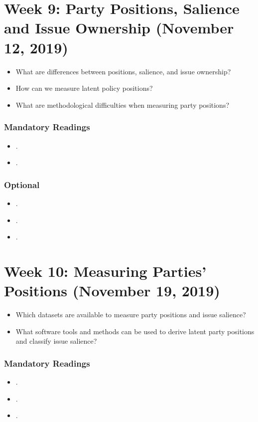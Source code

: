 \documentclass[abstract=on,parskip=full,headings=standardclasses,fontsize=11pt,paper=a4]{scrartcl}
\begin{document}
\section{Week 9:  Party Positions, Salience and Issue Ownership (November 12, 2019)}


\begin{itemize}
\renewcommand\labelitemi{--}
\item What are differences between positions, salience, and issue ownership?
\item How can we measure latent policy positions? 
\item What are methodological difficulties when measuring party positions?
\end{itemize}

\subsubsection*{Mandatory Readings}
\begin{itemize}
\item {}.
\item {}.
\end{itemize}


\subsubsection*{Optional}
\begin{itemize}
\item {}.
\item {}.
\item {}.
\end{itemize}


\section{Week 10:  Measuring Parties' Positions (November 19, 2019)}

\begin{itemize}
\renewcommand\labelitemi{--}
\item Which datasets are available to measure party positions and issue salience?
\item What software tools and methods can be used to derive latent party positions and classify issue salience?
\end{itemize}


\subsubsection*{Mandatory Readings}
\begin{itemize}
\item {}.
\item {}.
\item {}.
\end{itemize}
\end{document}
